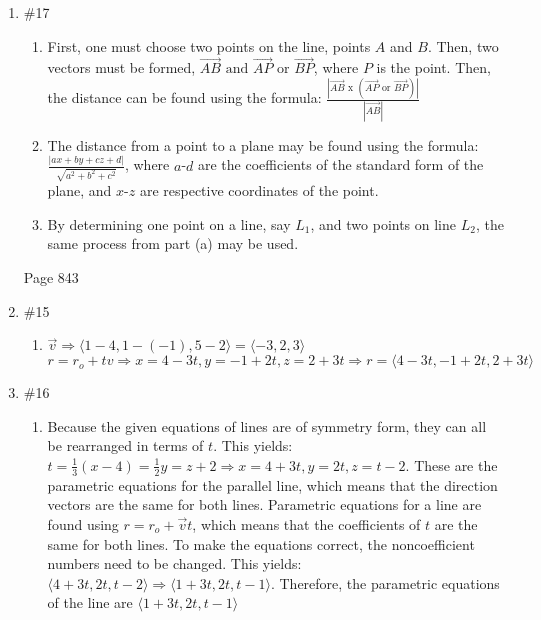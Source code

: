 \documentclass[12pt]{article}
\begin{document}
\begin{enumerate}
\begin{enumerate}
    \end{enumerate}

  \item \#17 \begin{enumerate}

      \item First, one must choose two points on the line, points $A$ and $B$. Then, two vectors must be formed, $\overrightarrow{AB} \text{ and } \overrightarrow{AP} \text{ or } \overrightarrow{BP}$, where $P$ is the point. Then, the distance can be found using the formula: $\frac{|\overrightarrow{AB}\text{ x }(\overrightarrow{AP} \text{ or } \overrightarrow{BP})|}{|\overrightarrow{AB}|}$  

      \item The distance from a point to a plane may be found using the formula: $\frac{|ax+by+cz+d|}{\sqrt{a^2+b^2+c^2}}$, where $a$-$d$ are the coefficients of the standard form of the plane, and $x$-$z$ are respective coordinates of the point.

      \item By determining one point on a line, say $L_1$, and two points on line $L_2$, the same process from part (a) may be used.

    \end{enumerate}

    \begin{center}

Page 843

    \end{center}

    \item \#15

    \begin{enumerate}
  \item $\overrightarrow{v}\Longrightarrow\langle1-4,1-(-1),5-2\rangle=\langle-3, 2, 3\rangle$ \\ $r=r_o+tv \Longrightarrow x=4-3t, y=-1+2t, z=2+3t \Longrightarrow r = \langle 4-3t, -1+2t, 2+3t\rangle$
    \end{enumerate}

    \item \#16 \begin{enumerate}

  \item Because the given equations of lines are of symmetry form, they can all be rearranged in terms of $t$. This yields: $t=\frac{1}{3}(x-4)=\frac{1}{2}y=z+2\Longrightarrow x=4+3t, y=2t, z=t-2$. These are the parametric equations for the parallel line, which means that the direction vectors are the same for both lines. Parametric equations for a line are found using $r=r_o +\overrightarrow{v}t$, which means that the coefficients of $t$ are the same for both lines. To make the equations correct, the noncoefficient numbers need to be changed. This yields: $\langle 4+3t, 2t, t-2 \rangle \Longrightarrow \langle 1+3t, 2t, t-1 \rangle$. Therefore, the parametric equations of the line are $\langle 1+3t, 2t, t-1 \rangle$
\end{enumerate}


\end{enumerate}
\end{document}
